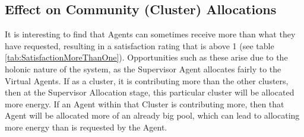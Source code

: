 \subsection*{Effect on Community (Cluster) Allocations}
It is interesting to find that Agents can sometimes receive more than what they have requested, resulting in a satisfaction rating that is above 1 (see table \ref{tab:SatisfactionMoreThanOne}). Opportunities such as these arise due to the holonic nature of the system, as the Supervisor Agent allocates fairly to the Virtual Agents. If as a cluster, it is contributing more than the other clusters, then at the Supervisor Allocation stage, this particular cluster will be allocated more energy. If an Agent within that Cluster is contributing more, then that Agent will be allocated more of an already big pool, which can lead to allocating more energy than is requested by the Agent. 

